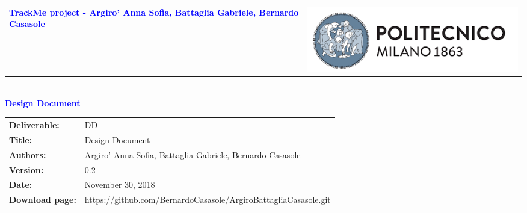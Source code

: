 




\begin{titlepage}


{\begin{table}[t!]
\centering
\begin{tabu} to \textwidth { X[1.3,r,p] X[1.7,l,p] }
\textcolor{Blue}{\textbf{\small{TrackMe project - Argiro' Anna Sofia, Battaglia Gabriele, Bernardo Casasole}}} & \includegraphics[scale=0.5]{images/PolimiLogo}
\end{tabu}
\end{table}}~\\ [7cm]


\centering
{\textcolor{Blue}{\textbf{\Huge{Design Document}}}} \\ [1cm]

\end{titlepage}

\begin{table}[h!]
\begin{tabu} to \textwidth { X[0.3,r,p] X[0.7,l,p] }
\hline

\textbf{Deliverable:} & DD\\
\textbf{Title:} & Design Document \\
\textbf{Authors:} & Argiro' Anna Sofia, Battaglia Gabriele, Bernardo Casasole \\
\textbf{Version:} & 0.2 \\
\textbf{Date:} & November 30, 2018 \\
\textbf{Download page:} & https://github.com/BernardoCasasole/ArgiroBattagliaCasasole.git \\
\hline
\end{tabu}
\end{table}

\setcounter{page}{2}

\newpage
{}
\tableofcontents

